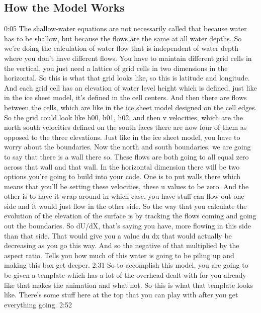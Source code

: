 {\subsection{How the Model Works}\index{}
0:05
The shallow-water equations are not necessarily called that because water has to be shallow, but because the flows are the same at all water depths. So we're doing the calculation of water flow that is independent of water depth where you don't have different flows. You have to maintain different grid cells in the vertical, you just need a lattice of grid cells in two dimensions in the horizontal. So this is what that grid looks like, so this is latitude and longitude. And each grid cell has an elevation of water level height which is defined, just like in the ice sheet model, it's defined in the cell centers. And then there are flows between the cells, which are like in the ice sheet model designed on the cell edges. So the grid could look like h00, h01, h02, and then v velocities, which are the north south velocities defined on the south faces there are now four of them as opposed to the three elevations. Just like in the ice sheet model, you have to worry about the boundaries. Now the north and south boundaries, we are going to say that there is a wall there so. These flows are both going to all equal zero across that wall and that wall. In the horizontal dimension there will be two options you're going to build into your code. One is to put walls there which means that you'll be setting these velocities, these u values to be zero. And the other is to have it wrap around in which case, you have stuff can flow out one side and it would just flow in the other side. So the way that you calculate the evolution of the elevation of the surface is by tracking the flows coming and going out the boundaries. So dU/dX, that's saying you have, more flowing in this side than that side. That would give you a value du dx that would actually be decreasing as you go this way. And so the negative of that multiplied by the aspect ratio. Tells you how much of this water is going to be piling up and making this box get deeper. 
2:31
So to accomplish this model, you are going to be given a template which has a lot of the overhead dealt with for you already like that makes the animation and what not. So this is what that template looks like. There's some stuff here at the top that you can play with after you get everything going. 
2:52
}
